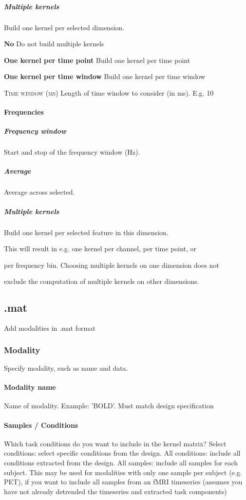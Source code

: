 \subparagraph{Multiple kernels}
Build one kernel per selected dimension.


\textbf{No}
Do not build multiple kernels


\textbf{One kernel per time point}
Build one kernel per time point


\textbf{One kernel per time window}
Build one kernel per time window


\textsc{Time window (ms)}
Length of time window to consider (in ms). E.g. 10


\paragraph{Frequencies}

\subparagraph{Frequency window}
Start and stop of the frequency window (Hz).


\subparagraph{Average}
Average across selected.


\subparagraph{Multiple kernels}
Build one kernel per selected feature in this dimension.

 This will result in e.g. one kernel per channel, per time point, or 

per frequency bin. Choosing multiple kernels on one dimension does not 

exclude the computation of multiple kernels on other dimensions.


\subsection{.mat}
Add modalities in .mat format


\subsubsection{Modality}
Specify modality, such as name and data.


\paragraph{Modality name}
Name of modality. Example: 'BOLD'. Must match design specification


\paragraph{Samples / Conditions}
Which task conditions do you want to include in the kernel matrix? Select conditions: select specific conditions from the design. All conditions: include all conditions extracted from the design. All samples: include all samples for each subject. This may be used for modalities with only one sample per subject (e.g. PET), if you want to include all samples from an fMRI timeseries (assumes you have not already detrended the timeseries and extracted task components)


